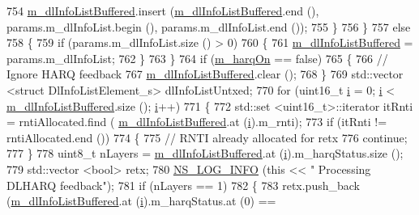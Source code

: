 \begin{DoxyCode}
754           \hyperlink{classns3_1_1FdMtFfMacScheduler_ac7f5da1ae0cf374d49f379b07c2c78a7}{m\_dlInfoListBuffered}.insert (\hyperlink{classns3_1_1FdMtFfMacScheduler_ac7f5da1ae0cf374d49f379b07c2c78a7}{m\_dlInfoListBuffered}.end (),
       params.m\_dlInfoList.begin (), params.m\_dlInfoList.end ());
755         \}
756     \}
757   \textcolor{keywordflow}{else}
758     \{
759       \textcolor{keywordflow}{if} (params.m\_dlInfoList.size () > 0)
760         \{
761           \hyperlink{classns3_1_1FdMtFfMacScheduler_ac7f5da1ae0cf374d49f379b07c2c78a7}{m\_dlInfoListBuffered} = params.m\_dlInfoList;
762         \}
763     \}
764   \textcolor{keywordflow}{if} (\hyperlink{classns3_1_1FdMtFfMacScheduler_abc95b8f62ff797ff3fb9ed21322c5f35}{m\_harqOn} == \textcolor{keyword}{false})
765     \{
766       \textcolor{comment}{// Ignore HARQ feedback}
767       \hyperlink{classns3_1_1FdMtFfMacScheduler_ac7f5da1ae0cf374d49f379b07c2c78a7}{m\_dlInfoListBuffered}.clear ();
768     \}
769   std::vector <struct DlInfoListElement\_s> dlInfoListUntxed;
770   \textcolor{keywordflow}{for} (uint16\_t \hyperlink{bernuolliDistribution_8m_a6f6ccfcf58b31cb6412107d9d5281426}{i} = 0; \hyperlink{bernuolliDistribution_8m_a6f6ccfcf58b31cb6412107d9d5281426}{i} < \hyperlink{classns3_1_1FdMtFfMacScheduler_ac7f5da1ae0cf374d49f379b07c2c78a7}{m\_dlInfoListBuffered}.size (); \hyperlink{bernuolliDistribution_8m_a6f6ccfcf58b31cb6412107d9d5281426}{i}++)
771     \{
772       std::set <uint16\_t>::iterator itRnti = rntiAllocated.find (
      \hyperlink{classns3_1_1FdMtFfMacScheduler_ac7f5da1ae0cf374d49f379b07c2c78a7}{m\_dlInfoListBuffered}.at (\hyperlink{bernuolliDistribution_8m_a6f6ccfcf58b31cb6412107d9d5281426}{i}).m\_rnti);
773       \textcolor{keywordflow}{if} (itRnti != rntiAllocated.end ())
774         \{
775           \textcolor{comment}{// RNTI already allocated for retx}
776           \textcolor{keywordflow}{continue};
777         \}
778       uint8\_t nLayers = \hyperlink{classns3_1_1FdMtFfMacScheduler_ac7f5da1ae0cf374d49f379b07c2c78a7}{m\_dlInfoListBuffered}.at (\hyperlink{bernuolliDistribution_8m_a6f6ccfcf58b31cb6412107d9d5281426}{i}).m\_harqStatus.size ();
779       std::vector <bool> retx;
780       \hyperlink{group__logging_gafbd73ee2cf9f26b319f49086d8e860fb}{NS\_LOG\_INFO} (\textcolor{keyword}{this} << \textcolor{stringliteral}{" Processing DLHARQ feedback"});
781       \textcolor{keywordflow}{if} (nLayers == 1)
782         \{
783           retx.push\_back (\hyperlink{classns3_1_1FdMtFfMacScheduler_ac7f5da1ae0cf374d49f379b07c2c78a7}{m\_dlInfoListBuffered}.at (\hyperlink{bernuolliDistribution_8m_a6f6ccfcf58b31cb6412107d9d5281426}{i}).m\_harqStatus.at (0) == 

\end{DoxyCode}
